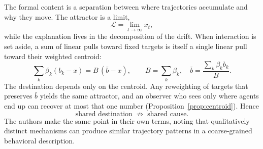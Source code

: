\documentclass[11pt]{article}
\theoremstyle{definition}
\theoremstyle{remark}
\begin{document}
The formal content is a separation between where trajectories accumulate and why they move. The attractor is a limit,
\begin{equation}
\mathcal{L} = \lim_{t \to \infty} x_t ,
\end{equation}
while the explanation lives in the decomposition of the drift. When interaction is set aside, a sum of linear pulls toward fixed targets is itself a single linear pull toward their weighted centroid:
\begin{equation}
\sum_k \beta_k (b_k - x) = B\,(\bar{b} - x), \qquad B = \sum_k \beta_k, \quad \bar{b} = \frac{\sum_k \beta_k b_k}{B}.
\end{equation}
The destination depends only on the centroid. Any reweighting of targets that preserves $\bar{b}$ yields the same attractor, and an observer who sees only where agents end up can recover at most that one number (Proposition~\ref{prop:centroid}). Hence
\begin{equation}
\text{shared destination} \;\not\Rightarrow\; \text{shared cause}.
\end{equation}
The authors make the same point in their own terms, noting that qualitatively distinct mechanisms can produce similar trajectory patterns in a coarse-grained behavioral description.
\end{document}
